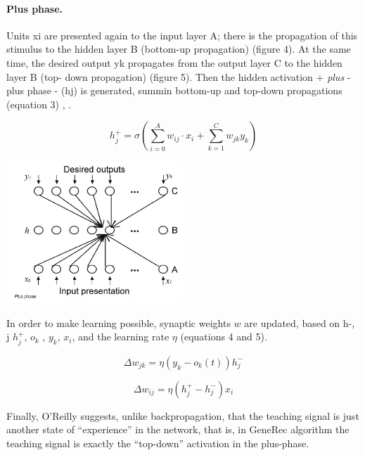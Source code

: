 \paragraph{Plus phase.} Units xi are presented again to the input layer A; there is the propagation of this stimulus to the hidden layer B (bottom-up propagation) (figure 4). At the same time, the desired output yk propagates from the output layer C to the hidden layer B (top- down propagation) (figure 5). Then the hidden activation + \emph{plus} - plus phase - (hj) is generated, summin bottom-up and top-down propagations (equation 3) \citet{o1996bio}, \citet{orru2008sabio}.

$$h_j^+ = \sigma\left( \sum_{i=0}^A w_{ij} \cdot x_i + \sum_{k=1}^C w_{jk} y_k \right)$$

\begin{center} 
\includegraphics[width=0.5\textwidth]{img/generec_plus_phase.png} \citet{orru2008sabio} 
\end{center} 

In order to make learning possible, synaptic weights $w$ are updated, based on h-, j  $h^+_j$, $o_k$ , $y_k$, $x_i$, and the learning rate $\eta$ (equations 4 and 5).

$$\Delta w_{jk} = \eta(y_k - o_k(t)) h^-_j $$

$$\Delta w_{ij} = \eta(h^+_j - h^-_j) x_i$$

Finally, O’Reilly \citet{o1998six} suggests, unlike backpropagation, that the teaching signal is just another state of “experience” in the network, that is, in GeneRec algorithm the teaching signal is exactly the “top-down” activation in the plus-phase.

